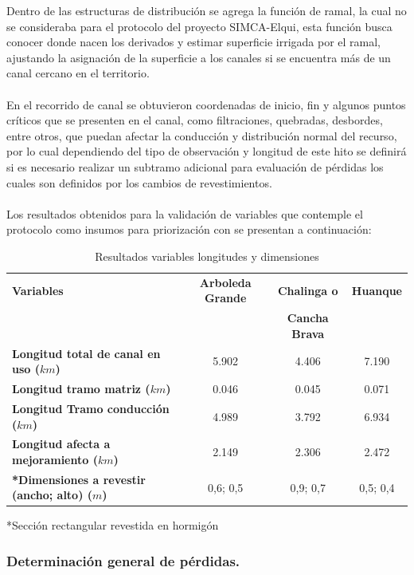 \documentclass[]{article}
\begin{document}
Dentro de las estructuras de distribución se agrega la función de ramal, la cual no se consideraba para el protocolo del proyecto SIMCA-Elqui, esta función busca conocer donde nacen los derivados y estimar superficie irrigada por el ramal, ajustando la asignación de la superficie a los canales si se encuentra más de un canal cercano en el territorio.\\
\\
En el recorrido de canal se obtuvieron coordenadas de inicio, fin y algunos puntos críticos que se presenten en el canal, como filtraciones, quebradas, desbordes, entre otros, que puedan afectar la conducción y distribución normal del recurso, por lo cual dependiendo del tipo de observación y longitud de este hito se definirá si es necesario realizar un subtramo adicional para evaluación de pérdidas los cuales son definidos por los cambios de revestimientos.\\
\\
Los resultados obtenidos para la validación de variables que contemple el protocolo como insumos para priorización con se presentan a continuación: 

\begin{table}[H]
\caption{Resultados variables longitudes y dimensiones}
\begin{tabular}{|l|ccc|}
\hline
\textbf{Variables}  & \textbf{Arboleda Grande} & \textbf{Chalinga o} & \textbf{Huanque} \\
 & & \textbf{Cancha Brava} &  \\ \hline                          
\textbf{Longitud total de canal en uso ($km$)}   & 5.902    & 4.406    & 7.190  \\
\textbf{Longitud tramo matriz ($km$)}  & 0.046    & 0.045    & 0.071    \\
\textbf{Longitud Tramo conducción ($km$)}  & 4.989  & 3.792  & 6.934   \\
\textbf{Longitud afecta a mejoramiento ($km$)}   & 2.149     & 2.306   & 2.472  \\
\textbf{*Dimensiones a revestir  (ancho; alto) ($m$)} & 0,6; 0,5 & 0,9; 0,7 & 0,5; 0,4\\ 
\hline
\end{tabular}
\small{*Sección rectangular revestida en hormigón}\\
\end{table}

\subsubsection{Determinación general de pérdidas.}
\end{document}
